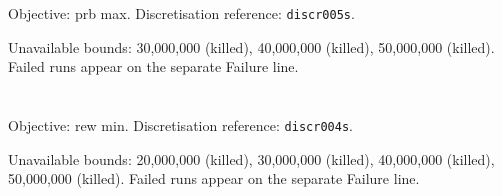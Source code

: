 \documentclass[a4paper,10pt]{article}
\begin{document}
\noindent\begin{minipage}{\linewidth}
\section*{\small\texttt{}}
Objective: prb max. Discretisation reference: \texttt{discr005s}.

\begin{minipage}[t]{0.48\linewidth}\centering

\end{minipage}
\hfill
\begin{minipage}[t]{0.48\linewidth}\centering

\end{minipage}
\par\medskip
Unavailable bounds: 30,000,000 (killed), 40,000,000 (killed), 50,000,000 (killed). Failed runs appear on the separate Failure line.

\end{minipage}\par\bigskip
\clearpage
\noindent\begin{minipage}{\linewidth}
\section*{\small\texttt{}}
Objective: rew min. Discretisation reference: \texttt{discr004s}.

\begin{minipage}[t]{0.48\linewidth}\centering

\end{minipage}
\hfill
\begin{minipage}[t]{0.48\linewidth}\centering

\end{minipage}
\par\medskip
Unavailable bounds: 20,000,000 (killed), 30,000,000 (killed), 40,000,000 (killed), 50,000,000 (killed). Failed runs appear on the separate Failure line.

\end{minipage}\par\bigskip
\end{document}
